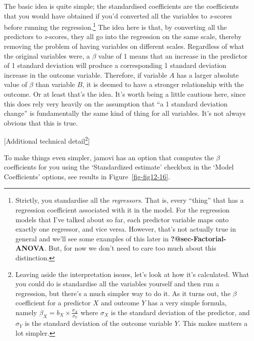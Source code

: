 \documentclass[
  a4paper,
]{book}
\begin{document}
The basic idea is quite simple; the standardised coefficients are the
coefficients that you would have obtained if you'd converted all the
variables to \emph{z}-scores before running the regression.\footnote{Strictly,
  you standardise all the \emph{regressors}. That is, every ``thing''
  that has a regression coefficient associated with it in the model. For
  the regression models that I've talked about so far, each predictor
  variable maps onto exactly one regressor, and vice versa. However,
  that's not actually true in general and we'll see some examples of
  this later in \textbf{?@sec-Factorial-ANOVA}. But, for now we don't
  need to care too much about this distinction.} The idea here is that,
by converting all the predictors to \emph{z}-scores, they all go into
the regression on the same scale, thereby removing the problem of having
variables on different scales. Regardless of what the original variables
were, a \(\beta\) value of 1 means that an increase in the predictor of
1 standard deviation will produce a corresponding 1 standard deviation
increase in the outcome variable. Therefore, if variable \(A\) has a
larger absolute value of \(\beta\) than variable \(B\), it is deemed to
have a stronger relationship with the outcome. Or at least that's the
idea. It's worth being a little cautious here, since this does rely very
heavily on the assumption that ``a 1 standard deviation change'' is
fundamentally the same kind of thing for all variables. It's not always
obvious that this is true.

{[}Additional technical detail\footnote{Leaving aside the interpretation
  issues, let's look at how it's calculated. What you could do is
  standardise all the variables yourself and then run a regression, but
  there's a much simpler way to do it. As it turns out, the \(\beta\)
  coefficient for a predictor \(X\) and outcome \(Y\) has a very simple
  formula, namely \(\beta_X=b_X \times \frac{\sigma_X}{\sigma_Y}\) where
  \(\sigma_X\) is the standard deviation of the predictor, and
  \(\sigma_Y\) is the standard deviation of the outcome variable \(Y\).
  This makes matters a lot simpler.}{]}

To make things even simpler, jamovi has an option that computes the
\(\beta\) coefficients for you using the `Standardized estimate'
checkbox in the `Model Coefficients' options, see results in
Figure~\ref{fig-fig12-16}.
\end{document}
